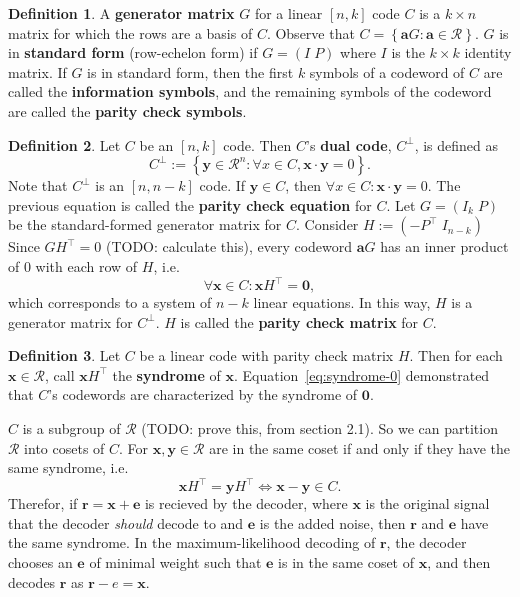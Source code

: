\documentclass{article}
\newcommand{\calR}{\mathcal{R}}
\newcommand{\dual}[1]{#1^\bot}
\newcommand{\trans}[1]{#1^\top}
\renewcommand{\=}{\equiv}
\newcommand{\set}[1]{\left\{ #1 \right\}}
\renewcommand{\v}{\mathbf}
\newcommand{\x}{{\v x}}
\newcommand{\y}{{\v y}}
\theoremstyle{plain}
\theoremstyle{definition}
\newtheorem{defn}{Definition}[subsection]
\newcommand{\TODO}[1]{(TODO: #1)}
\begin{document}
\begin{defn}
A \textbf{generator matrix} $G$ for a linear $[n,k]$ code $C$ is a $k \times n$ matrix for which the rows are a basis of $C$.
Observe that $C = \set{ \v a G : \v a \in \calR }$.
$G$ is in \textbf{standard form} (row-echelon form) if $G = (I \; P)$ where $I$ is the $k \times k$ identity matrix.
If $G$ is in standard form, then the first $k$ symbols of a codeword of $C$ are called the \textbf{information symbols}, and the remaining symbols of the codeword are called the \textbf{parity check symbols}.
\end{defn}

\begin{defn}
Let $C$ be an $[n,k]$ code. Then $C$'s \textbf{dual code}, $\dual C$, is defined as
$$ \dual C := \set{ \y \in \calR^n : \forall x \in C, \x \cdot \y = 0 }. $$
Note that $\dual C$ is an $[n, n-k]$ code.
If $\y \in C$, then $\forall x \in C : \x \cdot \y = 0$. The previous equation is called the \textbf{parity check equation} for $C$.
Let $G = (I_k \; P)$ be the standard-formed generator matrix for $C$.
Consider $H := (-\trans P \; I_{n-k})$
Since $G \trans H = 0$ \TODO{calculate this}, every codeword $\v a G$ has an inner product of 0 with each row of $H$, i.e.
\begin{equation}
  \label{eq:syndrome-0}
  \forall \x \in C : \x \trans H = \v 0,
\end{equation}
which corresponds to a system of $n-k$ linear equations.
In this way, $H$ is a generator matrix for $\dual C$.
$H$ is called the \textbf{parity check matrix} for $C$.
\end{defn}

\begin{defn}
Let $C$ be a linear code with parity check matrix $H$.
Then for each $\v x \in \calR$, call $\x \trans H$ the \textbf{syndrome} of $\x$.
Equation~\ref{eq:syndrome-0} demonstrated that $C$'s codewords are characterized by the syndrome of $\v 0$.

$C$ is a subgroup of $\calR$ \TODO{prove this, from section 2.1}.
So we can partition $\calR$ into cosets of $C$.
For $\x, \y \in \calR$ are in the same coset if and only if they have the same syndrome, i.e.
$$ \x \trans H = \y \trans H \iff \x - \y \in C. $$
Therefor, if $\v r = \x + \v e$ is recieved by the decoder, where $\x$ is the original signal that the decoder \textit{should} decode to and $\v e$ is the added noise, then $\v r$ and $\v e$ have the same syndrome.
In the maximum-likelihood decoding of $\v r$, the decoder chooses an $\v e$ of minimal weight such that $\v e$ is in the same coset of $\x$, and then decodes $\v r$ as $\v r - e = \v x$.
\end{defn}
\end{document}
